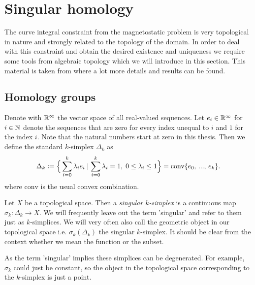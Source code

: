 \documentclass[../master_thesis.tex]{subfiles}
\begin{document}


\section{Singular homology}\label{sec:singular_homology}

The curve integral constraint from the magnetostatic problem is very topological %
in nature and strongly related to the topology of the domain. 
In order to deal with this constraint and obtain the desired existence and
uniqueness we require some tools from algebraic topology which we will introduce 
in this section. 
This material is taken from
\cite{topology_and_geometry} where a lot more details and results can be found.

\subsection{Homology groups}

Denote with $\mathbb{R}^\infty$ the vector space of all real-valued sequences. Let 
$e_i \in \mathbb{R}^\infty$ for $i \in \mathbb{N}$ denote the sequences 
that are zero for every index 
unequal to $i$ and $1$ for the index $i$. Note that 
the natural numbers start at zero in this thesis. Then we define the standard $k$-simplex 
$\Delta_k$ as
\begin{align*}
    \Delta_k \vcentcolon= \Big\{ \sum\limits_{i=0}^k  \lambda_i e_i \mid 
    \sum\limits_{i=0}^k \lambda_i = 1 , \; 0\leq \lambda_i \leq 1\Big\}
    = \text{conv} \{e_0,\,...,\, e_k\}.
\end{align*}
where $\text{conv}$ is the usual convex combination. 

\begin{definition}[$k$-simplex]
    Let $X$ be a topological space. Then a \textit{singular $k$-simplex} is a continuous 
    map $\sigma_k: \Delta_k \rightarrow X$. We will frequently leave out the term 'singular'
    and refer to them just as $k$-simplices. We will very often also call 
    the geometric object in our topological space i.e. $\sigma_k(\Delta_k)$
    the singular $k$-simplex. It should be clear from the context whether we mean 
    the function or the subset.
\end{definition}

As the term 'singular' implies these simplices can be degenerated. For example, $\sigma_k$ could 
just be constant, so the object in the topological space corresponding to the 
$k$-simplex is just a point.
\end{document}
